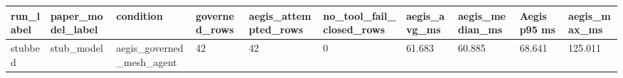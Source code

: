 \begin{tabular}{llllllllll}
 \hline
run\_label & paper\_model\_label & condition & governed\_rows & aegis\_attempted\_rows & no\_tool\_fail\_closed\_rows & aegis\_avg\_ms & aegis\_median\_ms & Aegis p95 ms & aegis\_max\_ms \\
 \hline
stubbed & stub\_model & aegis\_governed\_mesh\_agent & 42 & 42 & 0 & 61.683 & 60.885 & 68.641 & 125.011 \\
 \hline
\end{tabular}
